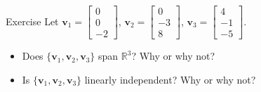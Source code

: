 \documentclass{beamer}
\theoremstyle{definition}
\theoremstyle{remark}
\begin{document}
\begin{frame}[t]{Exercise}
Let $\mathbf v_1=\begin{bmatrix}
0\\0\\-2
\end{bmatrix}$, $\mathbf v_2=\begin{bmatrix}
0\\-3\\8
\end{bmatrix}$, $\mathbf v_3=\begin{bmatrix}
4\\-1\\-5
\end{bmatrix}$.
\begin{itemize}
\item Does $\{\mathbf v_1,\mathbf v_2,\mathbf v_3\}$ span $\mathbb R^3$? Why or why not?\pause
\item Is $\{\mathbf v_1,\mathbf v_2,\mathbf v_3\}$ linearly independent? Why or why not?
\end{itemize}
\end{frame}


\end{document}
